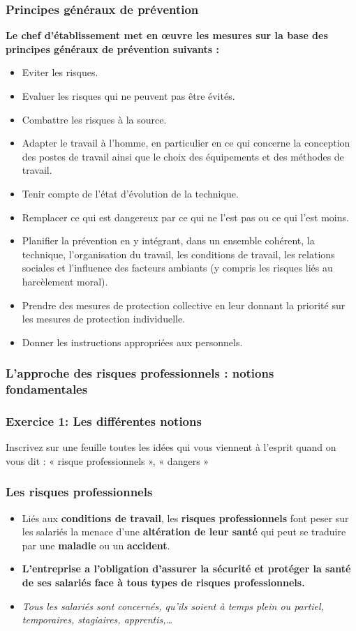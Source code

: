 \documentclass{beamer}
\begin{document}
\begin{frame}
\frametitle{Principes généraux de prévention}
\textbf{Le chef d'établissement met en œuvre les mesures sur la base des principes généraux de prévention suivants :}
\begin{itemize}
\item Eviter les risques.
\item Evaluer les risques qui ne peuvent pas être évités.
\item Combattre les risques à la source.
\item Adapter le travail à l’homme, en particulier en ce qui concerne la conception des postes de travail ainsi que  le choix des équipements et des méthodes de travail.
\item Tenir compte de l’état d’évolution de la technique.
\item Remplacer ce qui est dangereux par ce qui ne l’est pas ou ce qui l’est moins.
\item Planifier la prévention en y intégrant, dans un ensemble cohérent, la technique, l’organisation du travail, les conditions de travail, les relations sociales et l’influence des facteurs ambiants (y compris les risques liés au harcèlement moral).
\item Prendre des mesures de protection collective en leur donnant la priorité sur les mesures de protection individuelle.
\item Donner les instructions appropriées aux personnels.
\end{itemize}
\end{frame}

\begin{frame}
\frametitle{L’approche des risques professionnels : notions fondamentales}
\end{frame} 

\begin{frame}
\frametitle{Exercice 1: Les différentes notions}
Inscrivez sur une feuille toutes les idées qui vous viennent à l’esprit quand on vous dit : 
« risque professionnels », « dangers »
\end{frame} 

\begin{frame}
\frametitle{Les risques professionnels}
\begin{itemize}
\item Liés aux \textbf{conditions de travail}, les \textbf{risques professionnels} font peser sur les salariés la menace d’une \textbf{altération de leur santé} qui peut se traduire par une \textbf{maladie} ou un \textbf{accident}.
\item \textbf{L’entreprise a l’obligation d'assurer la sécurité et protéger la santé de ses salariés face à tous types de risques professionnels. }
\item \textit{Tous les salariés sont concernés, qu'ils soient à temps plein ou partiel, temporaires, stagiaires, apprentis,…}
\end{itemize}
\end{frame} 
\end{document}
